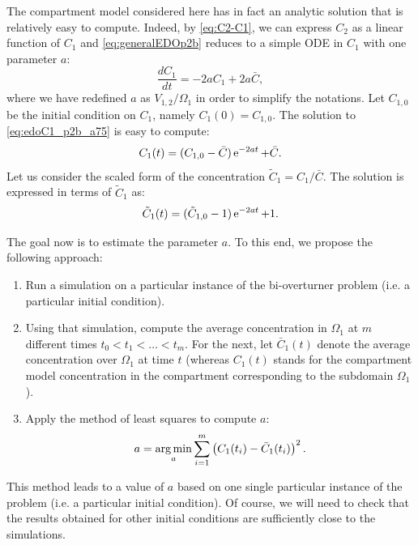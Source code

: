 The compartment model considered here has in fact an analytic solution that is relatively easy to compute. Indeed, by \eqref{eq:C2-C1}, we can express $C_2$ as a linear function of $C_1$ and \eqref{eq:generalEDOp2b} reduces to a simple ODE in $C_1$ with one parameter $a$:
\begin{equation} \label{eq:edoC1_p2b_a75}
	\frac{dC_1}{dt} = -2aC_1 + 2a\bar C,
\end{equation}
where we have redefined $a$ as $V_{1,2}/\Omega_1$ in order to simplify the notations. Let $C_{1,0}$ be the initial condition on $C_1$, namely $C_1(0) = C_{1,0}$. The solution to \eqref{eq:edoC1_p2b_a75} is easy to compute:
\begin{equation}
	C_1(t) = (C_{1,0} - \bar C) \operatorname{e}^{-2at} + \bar C.
\end{equation}
Let us consider the scaled form of the concentration $\tilde C_1 = C_1/\bar C$. The solution is expressed in terms of $\tilde C_1$ as:
\begin{equation}
	\tilde C_1(t) = (\tilde C_{1,0} - 1) \operatorname{e}^{-2at} + 1.
\end{equation}

The goal now is to estimate the parameter $a$. To this end, we propose the following approach:
\begin{enumerate}
	\item Run a simulation on a particular instance of the bi-overturner problem (i.e. a particular initial condition).
	\item Using that simulation, compute the average concentration in $\Omega_1$ at $m$ different times $t_0 < t_1 < \dots < t_m$. For the next, let $\bar C_1(t)$ denote the average concentration over $\Omega_1$ at time $t$ (whereas $C_1(t)$ stands for the compartment model concentration in the compartment corresponding to the subdomain $\Omega_1$).
	\item Apply the method of least squares to compute $a$:
	\begin{equation} \label{eq:a_minimization}
		a = \operatorname*{arg\,min}_a \sum_{i=1}^m \left(C_1(t_i)-\bar C_1(t_i)\right)^2.
	\end{equation}
\end{enumerate}
This method leads to a value of $a$ based on one single particular instance of the problem (i.e. a particular initial condition). Of course, we will need to check that the results obtained for other initial conditions are sufficiently close to the simulations.

